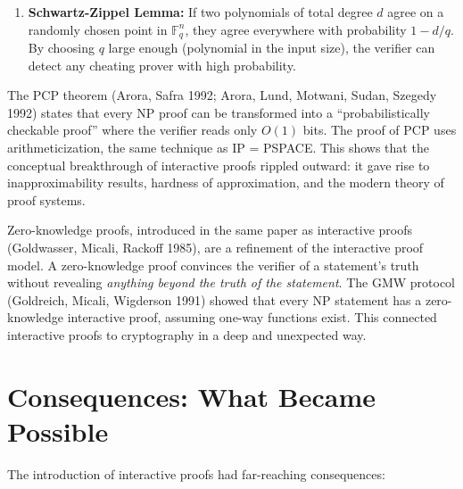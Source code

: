 \begin{enumerate}
\begin{enumerate}
\item \textbf{Schwartz-Zippel Lemma:} If two polynomials of total degree $d$ agree on a randomly chosen point in $\mathbb{F}_q^n$, they agree everywhere with probability $1 - d/q$. By choosing $q$ large enough (polynomial in the input size), the verifier can detect any cheating prover with high probability.
\end{enumerate}
\end{enumerate}

The PCP theorem (Arora, Safra 1992; Arora, Lund, Motwani, Sudan, Szegedy 1992) states that every NP proof can be transformed into a ``probabilistically checkable proof'' where the verifier reads only $O(1)$ bits. The proof of PCP uses arithmeticization, the same technique as IP = PSPACE. This shows that the conceptual breakthrough of interactive proofs rippled outward: it gave rise to inapproximability results, hardness of approximation, and the modern theory of proof systems.

Zero-knowledge proofs, introduced in the same paper as interactive proofs (Goldwasser, Micali, Rackoff 1985), are a refinement of the interactive proof model. A zero-knowledge proof convinces the verifier of a statement's truth without revealing \emph{anything beyond the truth of the statement}. The GMW protocol (Goldreich, Micali, Wigderson 1991) showed that every NP statement has a zero-knowledge interactive proof, assuming one-way functions exist. This connected interactive proofs to cryptography in a deep and unexpected way.

\section{Consequences: What Became Possible}
\label{sec:ip:consequences}

The introduction of interactive proofs had far-reaching consequences:

